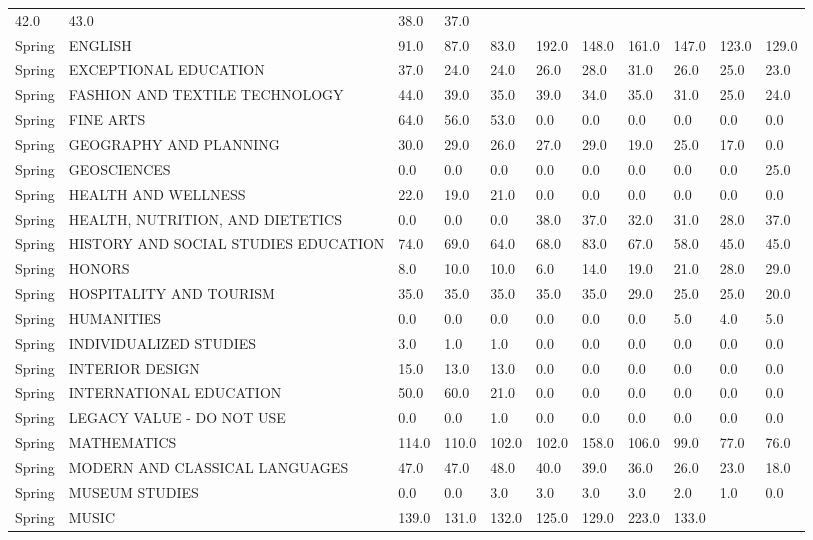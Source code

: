 \documentclass{article}
\begin{document}
\begin{longtable}[]{|l|p{4cm}|p{0.8cm}|p{0.8cm}|p{0.8cm}|p{0.8cm}|p{0.8cm}|p{0.8cm}|p{0.8cm}|p{0.8cm}|p{0.8cm}|}
42.0 & 43.0 & 38.0 & 37.0 \\
Spring & ENGLISH & 91.0 & 87.0 & 83.0 & 192.0 & 148.0 & 161.0 & 147.0 &
123.0 & 129.0 \\
Spring & EXCEPTIONAL EDUCATION & 37.0 & 24.0 & 24.0 & 26.0 & 28.0 & 31.0
& 26.0 & 25.0 & 23.0 \\
Spring & FASHION AND TEXTILE TECHNOLOGY & 44.0 & 39.0 & 35.0 & 39.0 &
34.0 & 35.0 & 31.0 & 25.0 & 24.0 \\
Spring & FINE ARTS & 64.0 & 56.0 & 53.0 & 0.0 & 0.0 & 0.0 & 0.0 & 0.0 &
0.0 \\
Spring & GEOGRAPHY AND PLANNING & 30.0 & 29.0 & 26.0 & 27.0 & 29.0 &
19.0 & 25.0 & 17.0 & 0.0 \\
Spring & GEOSCIENCES & 0.0 & 0.0 & 0.0 & 0.0 & 0.0 & 0.0 & 0.0 & 0.0 &
25.0 \\
Spring & HEALTH AND WELLNESS & 22.0 & 19.0 & 21.0 & 0.0 & 0.0 & 0.0 &
0.0 & 0.0 & 0.0 \\
Spring & HEALTH, NUTRITION, AND DIETETICS & 0.0 & 0.0 & 0.0 & 38.0 &
37.0 & 32.0 & 31.0 & 28.0 & 37.0 \\
Spring & HISTORY AND SOCIAL STUDIES EDUCATION & 74.0 & 69.0 & 64.0 &
68.0 & 83.0 & 67.0 & 58.0 & 45.0 & 45.0 \\
Spring & HONORS & 8.0 & 10.0 & 10.0 & 6.0 & 14.0 & 19.0 & 21.0 & 28.0 &
29.0 \\
Spring & HOSPITALITY AND TOURISM & 35.0 & 35.0 & 35.0 & 35.0 & 35.0 &
29.0 & 25.0 & 25.0 & 20.0 \\
Spring & HUMANITIES & 0.0 & 0.0 & 0.0 & 0.0 & 0.0 & 0.0 & 5.0 & 4.0 &
5.0 \\
Spring & INDIVIDUALIZED STUDIES & 3.0 & 1.0 & 1.0 & 0.0 & 0.0 & 0.0 &
0.0 & 0.0 & 0.0 \\
Spring & INTERIOR DESIGN & 15.0 & 13.0 & 13.0 & 0.0 & 0.0 & 0.0 & 0.0 &
0.0 & 0.0 \\
Spring & INTERNATIONAL EDUCATION & 50.0 & 60.0 & 21.0 & 0.0 & 0.0 & 0.0
& 0.0 & 0.0 & 0.0 \\
Spring & LEGACY VALUE - DO NOT USE & 0.0 & 0.0 & 1.0 & 0.0 & 0.0 & 0.0 &
0.0 & 0.0 & 0.0 \\
Spring & MATHEMATICS & 114.0 & 110.0 & 102.0 & 102.0 & 158.0 & 106.0 &
99.0 & 77.0 & 76.0 \\
Spring & MODERN AND CLASSICAL LANGUAGES & 47.0 & 47.0 & 48.0 & 40.0 &
39.0 & 36.0 & 26.0 & 23.0 & 18.0 \\
Spring & MUSEUM STUDIES & 0.0 & 0.0 & 3.0 & 3.0 & 3.0 & 3.0 & 2.0 & 1.0
& 0.0 \\
Spring & MUSIC & 139.0 & 131.0 & 132.0 & 125.0 & 129.0 & 223.0 & 133.0 &

\end{longtable}
\end{document}
